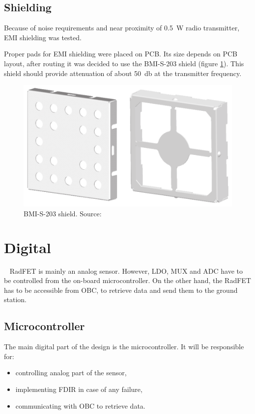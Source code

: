     \subsection{Shielding}
        Because of noise requirements and near proximity of \SI{0.5}{\watt} radio transmitter, EMI shielding was tested.

        Proper pads for EMI shielding were placed on PCB. Its size depends on PCB layout, after routing it was decided to use the BMI-S-203 shield (figure \ref{BMI-S-203}). This shield should provide attenuation of about \SI{50}{\decibel} at the transmitter frequency.

        \begin{figure}[H]
            \centering
            \includegraphics[width=0.7\paperwidth]{img/06/BMI-S-203.eps}
            \caption{BMI-S-203 shield. Source: \cite{EMI_shieldings_catalog}}
            \label{BMI-S-203}
        \end{figure}


\section{Digital}
    RadFET is mainly an analog sensor. However, LDO, MUX and ADC have to be controlled from the on-board microcontroller. On the other hand, the RadFET has to be accessible from OBC, to retrieve data and send them to the ground station.

    \subsection{Microcontroller}
        The main digital part of the design is the microcontroller. It will be responsible for:
        \begin{itemize}
            \item controlling analog part of the sensor,
            \item implementing FDIR in case of any failure,
            \item communicating with OBC to retrieve data.
        \end{itemize}

